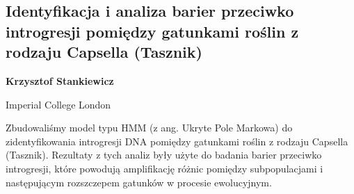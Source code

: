 \documentclass[\main/boa.tex]{subfiles}
\begin{document}
\subsection[Identyfikacja i analiza barier przeciwko introgresji pomiędzy gatunkami roślin z rodzaju Capsella (Tasznik)]{Identyfikacja i analiza barier przeciwko introgresji pomiędzy gatunkami roślin z rodzaju Capsella (Tasznik)}

\begin{minipage}{0.915\textwidth}
	\centering
  {\bf {} Krzysztof Stankiewicz}
\end{minipage}

\begin{affiliations}
\begin{minipage}{0.915\textwidth}
\centering
Imperial College London \\[-2pt]
\end{minipage}
\end{affiliations}

\vskip 0.3cm
Zbudowaliśmy model typu HMM (z ang. Ukryte Pole Markowa) do zidentyfikowania introgresji DNA pomiędzy gatunkami roślin z rodzaju Capsella (Tasznik). Rezultaty z tych analiz były użyte do badania barier przeciwko introgresji, które powodują amplifikację różnic pomiędzy subpopulacjami i następującym rozszczepem gatunków w procesie ewolucyjnym.
\end{document}
